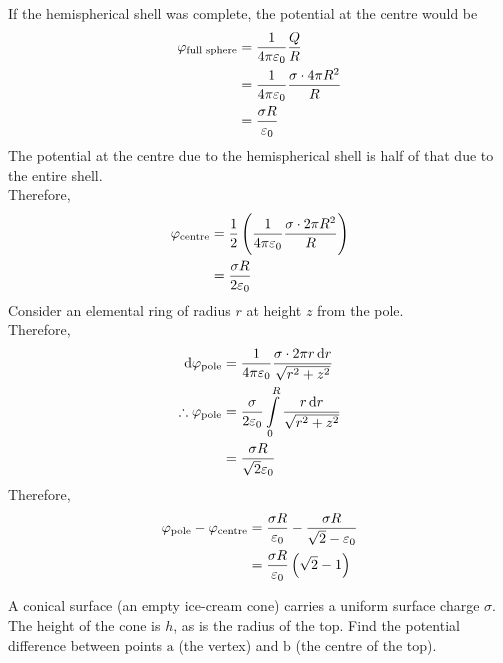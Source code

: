 \documentclass[fleqn, a4paper, 8pt, twoside]{amsart}
\theoremstyle{definition}
\theoremstyle{theorem}
\begin{document}
\begin{multicols}{2}
\begin{spacing}{0.6}
\begin{solution}
	If the hemispherical shell was complete, the potential at the centre would be
	\begin{align*}
		\varphi_{\textnormal{full sphere}} &= \frac{1}{4 \pi \varepsilon_0} \frac{Q}{R}\\
		&= \frac{1}{4 \pi \varepsilon_0} \frac{\sigma \cdot 4 \pi R^2}{R}\\
		&= \frac{\sigma R}{\varepsilon_0}
	\end{align*}
	The potential at the centre due to the hemispherical shell is half of that due to the entire shell.\\
	Therefore,
	\begin{align*}
		\varphi_{\textnormal{centre}} &= \frac{1}{2} \left( \frac{1}{4 \pi \varepsilon_0} \frac{\sigma \cdot 2 \pi R^2}{R} \right)\\
		&= \frac{\sigma R}{2 \varepsilon_0}
	\end{align*}
	Consider an elemental ring of radius $r$ at height $z$ from the pole.\\
	Therefore,
	\begin{align*}
		\dif \varphi_{\textnormal{pole}} &= \frac{1}{4 \pi \varepsilon_0} \frac{\sigma \cdot 2 \pi r \dif r}{\sqrt{r^2 + z^2}}\\
		\therefore \varphi_{\textnormal{pole}} &= \frac{\sigma}{2 \varepsilon_0} \int\limits_{0}^{R} \frac{r \dif r}{\sqrt{r^2 + z^2}}\\
		&= \frac{\sigma R}{\sqrt{2} \varepsilon_0}
	\end{align*}
	Therefore,
	\begin{align*}
		\varphi_{\textnormal{pole}} - \varphi_{\textnormal{centre}} &= \frac{\sigma R}{\varepsilon_0} - \frac{\sigma R}{\sqrt{2} - \varepsilon_0}\\
		&= \frac{\sigma R}{\varepsilon_0} \left( \sqrt{2} - 1 \right)
	\end{align*}
\end{solution}

\begin{question}
	A conical surface (an empty ice-cream cone) carries a uniform surface charge $\sigma$.
	The height of the cone is $h$, as is the radius of the top.
	Find the potential difference between points $\mathrm{a}$ (the vertex) and $\mathrm{b}$ (the centre of the top).
\end{question}

\begin{solution}
	\begin{figure}[H]
\end{figure}
\end{solution}
\end{spacing}
\end{multicols}
\end{document}
